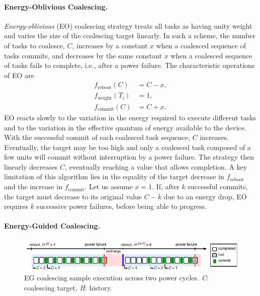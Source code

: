 \paragraph{Energy-Oblivious Coalescing.}
\label{subsec:energyBlind}
 
{\em Energy-oblivious} (EO) coalescing strategy treats all tasks as having unity weight and varies the size of the coalescing target linearly. In such a scheme, the number of tasks to coalesce, $C$, increases by a constant $x$ when a coalesced sequence of tasks commits, and decreases by the same constant $x$ when a coalesced sequence of tasks fails to complete, i.e., after a power failure. The characteristic operations of EO are
%
\begin{equation}
	\begin{split}
		f_\text{reboot}(C) & = C - x, \\
		f_\text{weight}(T_\text{i}) & =  1, \\
		f_\text{commit}(C) & = C + x.
	\end{split}
	\label{eq:eo}
\end{equation}
%
EO reacts slowly to the variation in the energy required to execute different tasks and to the variation in the effective quantum of energy available to the device. With the successful commit of each coalesced task sequence, $C$ increases. Eventually, the target may be too high and only a coalesced task composed of a few units will commit without interruption by a power failure. The strategy then linearly decreases $C$, eventually reaching a value that allows completion. A key limitation of this algorithm lies in the equality of the target decrease in $f_\text{reboot}$ and the increase in $f_\text{commit}$. Let us assume $x=1$. If, after $k$ successful commits, the target must decrease to its original value $C-k$ due to an energy drop, EO requires $k$ successive power failures, before being able to progress.

\paragraph{Energy-Guided Coalescing.}
\label{subsec:energyAware}

\begin{figure}
    \includegraphics[width=\linewidth]{figures/hg-coal-horiz.pdf}
    \caption{EG coalescing sample execution across two power cycles. \emph{C}: coalescing target, \emph{H}: history.}
    \label{fig:hg-coal}
\end{figure}

